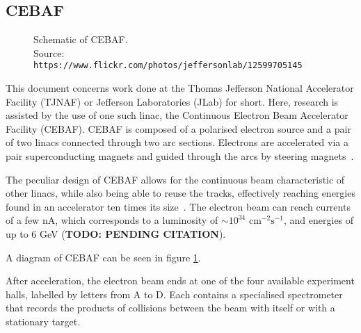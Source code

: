 \subsection{CEBAF} \label{ssec::cebaf}
    \begin{figure}[htbp]
        \centering
        \caption{\label{fig::cebaf} Schematic of CEBAF. \\
        Source: \texttt{https://www.flickr.com/photos/jeffersonlab/12599705145}}
    \end{figure}

    This document concerns work done at the Thomas Jefferson National Accelerator Facility (TJNAF) or Jefferson Laboratories (JLab) for short.
    Here, research is assisted by the use of one such linac, the Continuous Electron Beam Accelerator Facility (CEBAF).
    CEBAF is composed of a polarised electron source and a pair of two linacs connected through two arc sections.
    Electrons are accelerated via a pair superconducting magnets and guided through the arcs by steering magnets~\cite{leemann2001continuous}.

    The peculiar design of CEBAF allows for the continuous beam characteristic of other linacs, while also being able to reuse the tracks, effectively reaching energies found in an accelerator ten times its size~\cite{leemann2001continuous}.
    The electron beam can reach currents of a few nA, which corresponds to a luminosity of $\sim10^{34}$ $\text{cm}^{-2} \text{s}^{-1}$, and energies of up to 6 GeV (\textbf{TODO: PENDING CITATION}).

    A diagram of CEBAF can be seen in figure \ref{fig::cebaf}.

    After acceleration, the electron beam ends at one of the four available experiment halls, labelled by letters from A to D.
    Each contains a specialised spectrometer that records the products of collisions between the beam with itself or with a stationary target.
